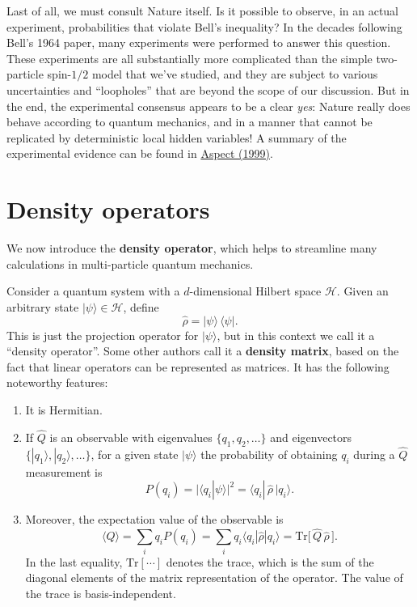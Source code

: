 \documentclass[pra,12pt]{revtex4}
\begin{document}
Last of all, we must consult Nature itself.  Is it possible to
observe, in an actual experiment, probabilities that violate Bell's
inequality?  In the decades following Bell's 1964 paper, many
experiments were performed to answer this question.  These experiments
are all substantially more complicated than the simple two-particle
spin-$1/2$ model that we've studied, and they are subject to various
uncertainties and ``loopholes'' that are beyond the scope of our
discussion.  But in the end, the experimental consensus appears to be
a clear \textit{yes}: Nature really does behave according to quantum
mechanics, and in a manner that cannot be replicated by deterministic
local hidden variables!  A summary of the experimental evidence can be
found in \hyperref[cite:aspect]{Aspect (1999)}.

\section{Density operators}

We now introduce the \textbf{density operator}, which helps to
streamline many calculations in multi-particle quantum mechanics.

Consider a quantum system with a $d$-dimensional Hilbert space
$\mathscr{H}$.  Given an arbitrary state $|\psi\rangle \in
\mathscr{H}$, define
\begin{equation}
  \hat{\rho} = |\psi\rangle\, \langle\psi|.
  \label{rho_pure}
\end{equation}
This is just the projection operator for $|\psi\rangle$, but in this
context we call it a ``density operator''.  Some other authors call it
a \textbf{density matrix}, based on the fact that linear operators can
be represented as matrices.  It has the following noteworthy features:

\begin{enumerate}
\item It is Hermitian.  

\item If $\hat{Q}$ is an observable with eigenvalues
  $\{q_1,q_2,\dots\}$ and eigenvectors
  $\{|q_1\rangle,|q_2\rangle,\dots\}$, for a given state
  $|\psi\rangle$ the probability of obtaining $q_i$ during a $\hat{Q}$
  measurement is
  \begin{equation}
    P(q_i) = \big|\langle q_i | \psi\rangle\big|^2 =
    \langle q_i |\, \hat{\rho}\, |q_i \rangle.
    \label{Pi_rho}
  \end{equation}

\item Moreover, the expectation value of the observable is
  \begin{equation}
    \langle Q\rangle = \sum_i q_i P(q_i) =
    \sum_i q_i \langle q_i | \hat{\rho}|q_i\rangle =
    \mathrm{Tr}\big[\,\hat{Q} \, \hat{\rho}\,\big].
    \label{Qexpt}
  \end{equation}
  In the last equality, $\mathrm{Tr}[\cdots]$ denotes the trace, which
  is the sum of the diagonal elements of the matrix representation of
  the operator.  The value of the trace is basis-independent.
\end{enumerate}
\end{document}

